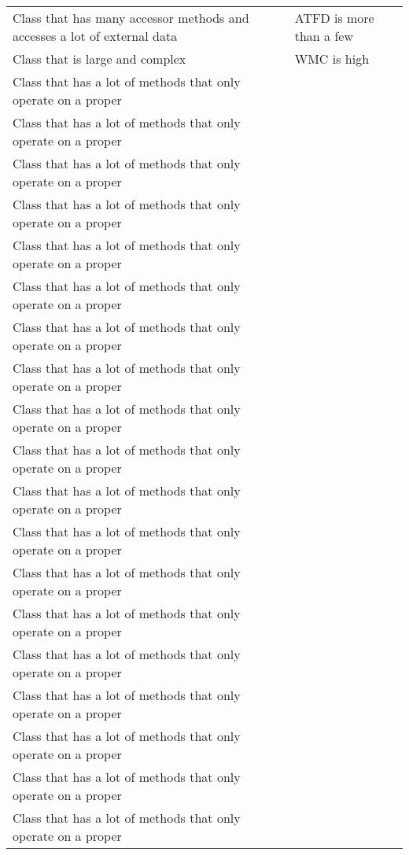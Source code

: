 \begin{texcodeonly}[]{}
\begin{xltabular}{\textwidth}{XX}
    Class that has many accessor methods and accesses a lot of external data & ATFD is more than a few \\
    Class that is large and complex & WMC is high \\
    Class that has a lot of methods that only operate on a proper & \\
    Class that has a lot of methods that only operate on a proper & \\
    Class that has a lot of methods that only operate on a proper & \\
    Class that has a lot of methods that only operate on a proper & \\
    Class that has a lot of methods that only operate on a proper & \\
    Class that has a lot of methods that only operate on a proper & \\
    Class that has a lot of methods that only operate on a proper & \\
    Class that has a lot of methods that only operate on a proper & \\
    Class that has a lot of methods that only operate on a proper & \\
    Class that has a lot of methods that only operate on a proper & \\
    Class that has a lot of methods that only operate on a proper & \\
    Class that has a lot of methods that only operate on a proper & \\
    Class that has a lot of methods that only operate on a proper & \\
    Class that has a lot of methods that only operate on a proper & \\
    Class that has a lot of methods that only operate on a proper & \\
    Class that has a lot of methods that only operate on a proper & \\
    Class that has a lot of methods that only operate on a proper & \\
    Class that has a lot of methods that only operate on a proper & \\
    Class that has a lot of methods that only operate on a proper & \\
  \end{xltabular}
\end{texcodeonly}

